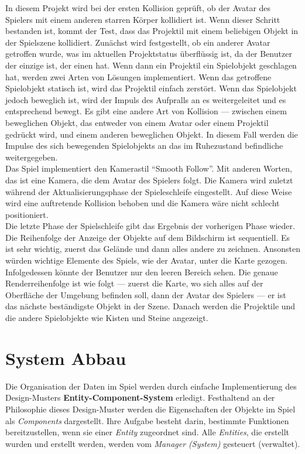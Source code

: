 \documentclass[
  10pt,
  a4paper,
  oneside,
  headers,
  headinclude,
  footinclude,
  BCOR5mm,
]{article}
\begin{document}
In diesem Projekt wird bei der ersten Kollision geprüft, ob der Avatar des
Spielers mit einem anderen starren Körper kollidiert ist. Wenn dieser Schritt
bestanden ist, kommt der Test, dass das Projektil mit einem beliebigen Objekt in
der Spielszene kollidiert. Zunächst wird festgestellt, ob ein anderer Avatar
getroffen wurde, was im aktuellen Projektstatus überflüssig ist, da der Benutzer
der einzige ist, der einen hat. Wenn dann ein Projektil ein Spielobjekt
geschlagen hat, werden zwei Arten von Lösungen implementiert. Wenn das
getroffene Spielobjekt statisch ist, wird das Projektil einfach zerstört. Wenn
das Spielobjekt jedoch beweglich ist, wird der Impuls des Aufpralls an es
weitergeleitet und es entsprechend bewegt. Es gibt eine andere Art von Kollision
--- zwischen einem beweglichen Objekt, das entweder von einem Avatar oder einem
Projektil gedrückt wird, und einem anderen beweglichen Objekt. In diesem Fall
werden die Impulse des sich bewegenden Spielobjekts an das im Ruhezustand
befindliche weitergegeben. \\
Das Spiel implementiert den Kamerastil ``Smooth Follow''. Mit anderen Worten,
das ist eine Kamera, die dem Avatar des Spielers folgt. Die Kamera wird zuletzt
während der Aktualisierungsphase der Spieleschleife eingestellt. Auf diese Weise
wird eine auftretende Kollision behoben und die Kamera wäre nicht schlecht
positioniert. \\
Die letzte Phase der Spielschleife gibt das Ergebnis der vorherigen Phase
wieder. Die Reihenfolge der Anzeige der Objekte auf dem Bildschirm ist
sequentiell. Es ist sehr wichtig, zuerst das Gelände und dann alles andere zu
zeichnen. Ansonsten würden wichtige Elemente des Spiels, wie der Avatar, unter
die Karte gezogen. Infolgedessen könnte der Benutzer nur den leeren Bereich
sehen. Die genaue Renderreihenfolge ist wie folgt --- zuerst die Karte, wo sich
alles auf der Oberfläche der Umgebung befinden soll, dann der Avatar des
Spielers --- er ist das nächste beständigste Objekt in der Szene. Danach werden
die Projektile und die andere Spielobjekte wie Kisten und Steine angezeigt. \\

\section{System Abbau}
Die Organisation der Daten im Spiel werden durch einfache Implementierung des
Design-Musters \textbf{Entity-Component-System} erledigt. Festhaltend an der
Philosophie dieses Design-Muster werden die Eigenschaften der Objekte im Spiel
als \textit{Components} dargestellt. Ihre Aufgabe besteht darin, bestimmte
Funktionen bereitzustellen, wenn sie einer \textit{Entity} zugeordnet sind.
Alle \textit{Entities}, die erstellt wurden und erstellt werden, werden vom
\textit{Manager (System)} gesteuert (verwaltet).
\end{document}
